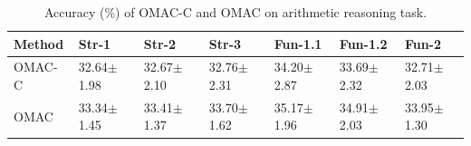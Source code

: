 \begin{table}[t]\footnotesize
  \centering
  \begin{threeparttable}
    \captionsetup{width=\textwidth}
    \caption{Accuracy (\%) of OMAC-C and OMAC on arithmetic reasoning task.}
    \label{tab:ablation}


    \begin{minipage}{0.9\textwidth}
    \begin{tabular}{%
        p{1.6cm}<{\centering}
        p{1.4cm}<{\centering}
        p{1.4cm}<{\centering}
        p{1.4cm}<{\centering}
        p{1.4cm}<{\centering}
        p{1.4cm}<{\centering}
        p{1.4cm}<{\centering}}
      \toprule
      Method & Str-1\scriptsize & Str-2\scriptsize & Str-3\scriptsize
      & Fun-1.1\scriptsize & Fun-1.2\scriptsize & Fun-2 \\
      \midrule
      OMAC-C
        & 32.64\tiny{$\pm$1.98} & 32.67\tiny{$\pm$2.10}
        & 32.76\tiny{$\pm$2.31} & 34.20\tiny{$\pm$2.87}
        & 33.69\tiny{$\pm$2.32} & 32.71\tiny{$\pm$2.03} \\
      OMAC
        & 33.34\tiny{$\pm$1.45} & 33.41\tiny{$\pm$1.37}
        & 33.70\tiny{$\pm$1.62} & 35.17\tiny{$\pm$1.96}
        & 34.91\tiny{$\pm$2.03} & 33.95\tiny{$\pm$1.30} \\
      \bottomrule
    \end{tabular}
    \end{minipage}

  \end{threeparttable}
  \vspace{-2mm}
\end{table}


